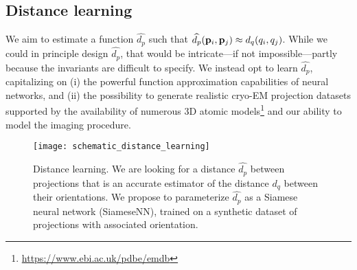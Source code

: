 \subsection{Distance learning}\label{sec:method:distance-learning}


We aim to estimate a function $\widehat{d_p}$ such that $\widehat{d_p}(\mathbf{p}_i, \mathbf{p}_j) \approx d_q(q_i, q_j)$.
While we could in principle design $\widehat{d_p}$, that would be intricate---if not impossible---partly because the invariants are difficult to specify.
We instead opt to learn $\widehat{d_p}$, capitalizing on (i) the powerful function approximation capabilities of neural networks, and (ii) the possibility to generate realistic cryo-EM projection datasets supported by the availability of numerous 3D atomic models\footnote{\url{https://www.ebi.ac.uk/pdbe/emdb}} and our ability to model the imaging procedure.

\begin{figure}
    \centering
    \texttt{[image: schematic\_distance\_learning]}
    \caption{%
        Distance learning.
        We are looking for a distance $\widehat{d_p}$ between projections that is an accurate estimator of the distance $d_q$ between their orientations.
        We propose to parameterize $\widehat{d_p}$ as a Siamese neural network (SiameseNN), trained on a synthetic dataset of projections with associated orientation.
}\label{fig:schematic:distance-learning}
\end{figure}

